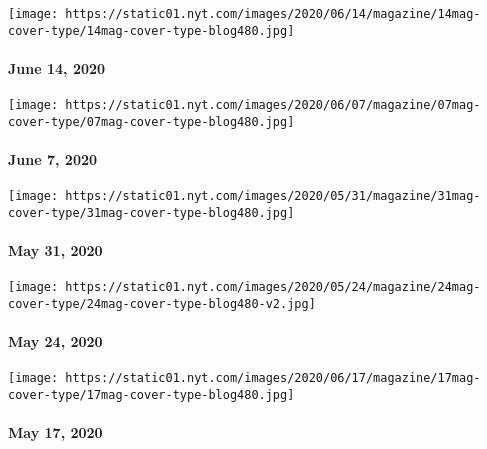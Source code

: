 \href{https://www.nytimes.com/issue/magazine/2020/06/12/the-61420-issue}{}

\texttt{[image: https://static01.nyt.com/images/2020/06/14/magazine/14mag-cover-type/14mag-cover-type-blog480.jpg]}

\hypertarget{june-14-2020}{%
\paragraph{June 14, 2020}\label{june-14-2020}}

\href{https://www.nytimes.com/issue/magazine/2020/06/05/the-6720-issue}{}

\texttt{[image: https://static01.nyt.com/images/2020/06/07/magazine/07mag-cover-type/07mag-cover-type-blog480.jpg]}

\hypertarget{june-7-2020}{%
\paragraph{June 7, 2020}\label{june-7-2020}}

\href{https://www.nytimes.com/issue/magazine/2020/05/29/the-53120-issue}{}

\texttt{[image: https://static01.nyt.com/images/2020/05/31/magazine/31mag-cover-type/31mag-cover-type-blog480.jpg]}

\hypertarget{may-31-2020}{%
\paragraph{May 31, 2020}\label{may-31-2020}}

\href{https://www.nytimes.com/issue/magazine/2020/05/22/the-52420-issue}{}

\texttt{[image: https://static01.nyt.com/images/2020/05/24/magazine/24mag-cover-type/24mag-cover-type-blog480-v2.jpg]}

\hypertarget{may-24-2020}{%
\paragraph{May 24, 2020}\label{may-24-2020}}

\href{https://www.nytimes.com/issue/magazine/2020/05/24/the-51720-issue}{}

\texttt{[image: https://static01.nyt.com/images/2020/06/17/magazine/17mag-cover-type/17mag-cover-type-blog480.jpg]}

\hypertarget{may-17-2020}{%
\paragraph{May 17, 2020}\label{may-17-2020}}

